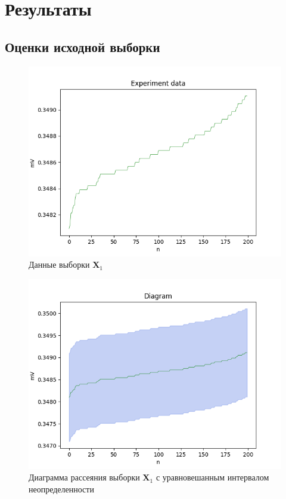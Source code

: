 \documentclass[./main.tex]{subfiles}
\begin{document}
  
\section{Результаты}

\subsection{Оценки исходной выборки} 

\begin{figure}[ht]
	\begin{center}
		\includegraphics[scale = 0.55]{../images/data.png}
	\end{center}
	\caption{Данные выборки $\bm{X}_1$}
\end{figure}

\begin{figure}[ht]
	\begin{center}
		\includegraphics[scale = 0.55]{../images/diagram_beta_None.png}
	\end{center}
	\caption{Диаграмма рассеяния выборки $\bm{X}_1$ с уравновешанным интервалом неопределенности}
\end{figure}
\end{document}
